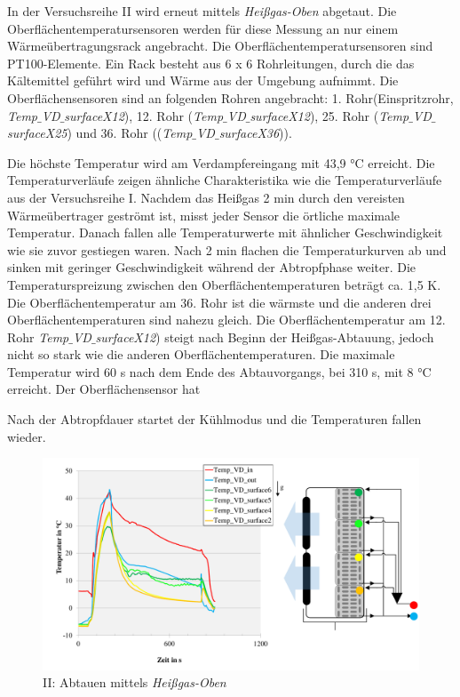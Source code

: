 In der Versuchsreihe II wird erneut mittels \textit{Heißgas-Oben} abgetaut. Die Oberflächentemperatursensoren werden für diese Messung an nur einem Wärmeübertragungsrack angebracht. Die Oberflächentemperatursensoren sind PT100-Elemente. Ein Rack besteht aus 6 x 6 Rohrleitungen, durch die das Kältemittel geführt wird und Wärme aus der Umgebung aufnimmt. Die Oberflächensensoren sind an folgenden Rohren angebracht: 1. Rohr(Einspritzrohr, \textit{Temp$\_$VD$\_$surfaceX12}), 12. Rohr (\textit{Temp$\_$VD$\_$surfaceX12}), 25. Rohr (\textit{Temp$\_$VD$\_$surfaceX25}) und 36.  Rohr ((\textit{Temp$\_$VD$\_$surfaceX36})).

Die höchste Temperatur wird am Verdampfereingang mit 43,9 °C erreicht. Die Temperaturverläufe zeigen ähnliche Charakteristika wie die Temperaturverläufe aus der Versuchsreihe I. Nachdem das Heißgas 2 min durch den vereisten Wärmeübertrager geströmt ist, misst jeder Sensor die örtliche maximale Temperatur.  Danach fallen alle Temperaturwerte mit ähnlicher Geschwindigkeit wie sie zuvor gestiegen waren. Nach 2 min flachen die Temperaturkurven ab und sinken mit geringer Geschwindigkeit während der Abtropfphase weiter. Die Temperaturspreizung zwischen den Oberflächentemperaturen beträgt ca. 1,5 K. Die Oberflächentemperatur am 36. Rohr ist die wärmste und die anderen drei Oberflächentemperaturen sind nahezu gleich. Die Oberflächentemperatur am 12. Rohr \textit{Temp$\_$VD$\_$surfaceX12}) steigt nach Beginn der Heißgas-Abtauung, jedoch nicht so stark wie die anderen Oberflächentemperaturen. Die maximale Temperatur wird 60 s nach dem Ende des Abtauvorgangs, bei 310 s, mit 8 °C erreicht. Der Oberflächensensor hat 

Nach der Abtropfdauer startet der Kühlmodus und die Temperaturen fallen wieder. 

\begin{figure}[htb]
\centering		\includegraphics[page=2,width=1.08\textwidth]{Pictures/Inbetriebnahme/Abtaumethoden_Tempverlaufe.pdf}
\caption{II: Abtauen mittels \textit{Heißgas-Oben}}
\label{fig:II_Heissgas_oben}
\end{figure}

